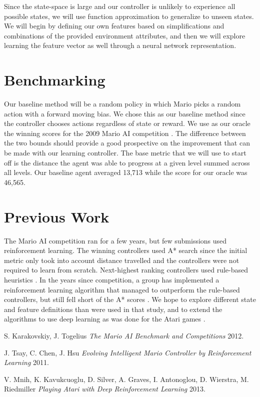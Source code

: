 \documentclass[12pt]{article}
\begin{document}
Since the state-space is large and our controller is unlikely to experience all possible states, we will use function approximation to generalize to unseen states. We will begin by defining our own features based on simplifications and combinations of the provided environment attributes, and then we will explore learning the feature vector as well through a neural network representation.

\section{Benchmarking}

Our baseline method will be a random policy in which Mario picks a random action with a forward moving bias. We chose this as our baseline method since the controller chooses actions regardless of state or reward. We use as our oracle the winning scores for the 2009 Mario AI competition \cite{karakovskiy}. The difference between the two bounds should provide a good prospective on the improvement that can be made with our learning controller. The base metric that we will use to start off is the distance the agent was able to progress at a given level summed across all levels. Our baseline agent averaged 13,713 while the score for our oracle was 46,565.

\section{Previous Work}

The Mario AI competition ran for a few years, but few submissions used reinforcement learning. The winning controllers used A* search since the initial metric only took into account distance travelled and the controllers were not required to learn from scratch. Next-highest ranking controllers used rule-based heuristics \cite{karakovskiy}. In the years since competition, a group has implemented a reinforcement learning algorithm that managed to outperform the rule-based controllers, but still fell short of the A* scores \cite{tsay}. We hope to explore different state and feature definitions than were used in that study, and to extend the algorithms to use deep learning as was done for the Atari games \cite{mnih}.

\begin{thebibliography}{1}

 S. Karakovskiy, J. Togelius {\em The Mario AI Benchmark and Competitions} 2012.

  J. Tsay, C. Chen, J. Hsu {\em Evolving Intelligent Mario Controller by Reinforcement Learning} 2011.

 V. Mnih, K. Kavukcuoglu, D. Silver, A. Graves, I. Antonoglou, D. Wierstra, M. Riedmiller {\em Playing Atari with Deep Reinforcement Learning} 2013.

\end{thebibliography}
\end{document}
